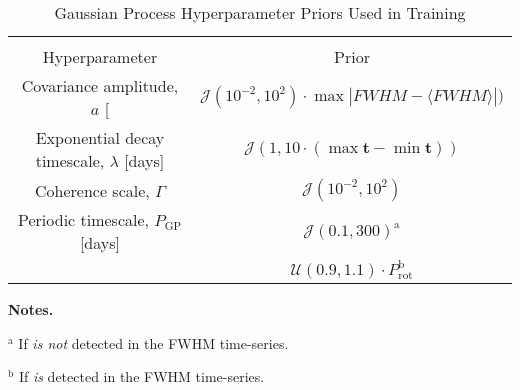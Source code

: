 \begin{landscape}
\begin{table*}
  \small
  \renewcommand{\arraystretch}{0.7}
  \caption{Gaussian Process Hyperparameter Priors Used in Training}
  \label{BStable:gppriors}
  \begin{tabular}{cc}
    \hline \\ [-1ex]
    Hyperparameter & Prior \\
    \hline
    Covariance amplitude, $a$ [\mps{]} & $\mathcal{J}(10^{-2}, 10^2) \cdot \max{|FWHM-\langle FWHM \rangle|})$ \\
    Exponential decay timescale, $\lambda$ [days] & $\mathcal{J}(1, 10\cdot (\max{\mathbf{t}}-\min{\mathbf{t}}))$  \\
    Coherence scale, $\Gamma$ & $\mathcal{J}(10^{-2}, 10^2)$ \\
    Periodic timescale, $P_{\text{GP}}$ [days] & $\mathcal{J}(0.1,300)^{\text{a}}$ \\
    & $\mathcal{U}(0.9, 1.1) \cdot P_{\text{rot}}^{\text{b}}$
  \end{tabular}
  \begin{list}{}{}
  \item {\bf{Notes.}}
  \item $^{\text{a}}$ If \prot{} \emph{is not} detected in the FWHM time-series.
  \item $^{\text{b}}$ If \prot{} \emph{is} detected in the FWHM time-series.
  \end{list}
\end{table*}
\end{landscape}
